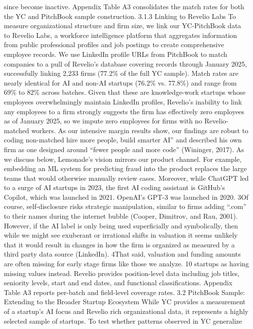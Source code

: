 since become inactive.
Appendix Table A3 consolidates the match rates for both the YC and
PitchBook sample construction.
3.1.3
Linking to Revelio Labs
To measure organizational structure and firm size, we link our YC-PitchBook data to Revelio
Labs, a workforce intelligence platform that aggregates information from public professional profiles
and job postings to create comprehensive employee records. We use LinkedIn profile URLs from
PitchBook to match companies to a pull of Revelio’s database covering records through January
2025, successfully linking 2,233 firms (77.2\% of the full YC sample). Match rates are nearly identical
for AI and non-AI startups (76.2\% vs. 77.8\%) and range from 69\% to 82\% across batches. Given
that these are knowledge-work startups whose employees overwhelmingly maintain LinkedIn profiles,
Revelio’s inability to link any employees to a firm strongly suggests the firm has effectively zero
employees as of January 2025, so we impute zero employees for firms with no Revelio-matched
workers.
As our intensive margin results show, our findings are robust to coding non-matched
hire more people, build smarter AI” and described his own firm as one designed around “fewer people and more
code” (Wininger, 2017). As we discuss below, Lemonade’s vision mirrors our product channel. For example,
embedding an ML system for predicting fraud into the product replaces the large teams that would otherwise
manually review cases. Moreover, while ChatGPT led to a surge of AI startups in 2023, the first AI coding assistant
is GitHub’s Copilot, which was launched in 2021. OpenAI’s GPT-3 was launched in 2020.
3Of course, self-disclosure risks strategic manipulation, similar to firms adding “.com” to their names during the
internet bubble (Cooper, Dimitrov, and Rau, 2001). However, if the AI label is only being used superficially and
symbolically, then while we might see exuberant or irrational shifts in valuation it seems unlikely that it would
result in changes in how the firm is organized as measured by a third party data source (LinkedIn).
4That said, valuation and funding amounts are often missing for early stage firms like those we analyze.
10
startups as having missing values instead. Revelio provides position-level data including job titles,
seniority levels, start and end dates, and functional classifications. Appendix Table A3 reports
per-batch and field-level coverage rates.
3.2
PitchBook Sample: Extending to the Broader Startup Ecosystem
While YC provides a measurement of a startup’s AI focus and Revelio rich organizational data, it
represents a highly selected sample of startups. To test whether patterns observed in YC generalize
